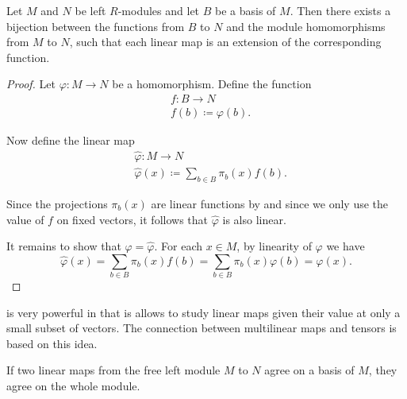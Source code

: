 \begin{theorem}\label{thm:linear_map_iff_function_on_basis}
  Let \( M \) and \( N \) be left \( R \)-modules and let \( B \) be a basis of \( M \). Then there exists a bijection between the functions from \( B \) to \( N \) and the module homomorphisms from \( M \) to \( N \), such that each linear map is an extension of the corresponding function.
\end{theorem}
\begin{proof}
  Let \( \varphi: M \to N \) be a homomorphism. Define the function
  \begin{align*}
    &f: B \to N \\
    &f(b) \coloneqq \varphi(b).
  \end{align*}

  Now define the linear map
  \begin{align*}
    &\hat \varphi: M \to N \\
    &\hat \varphi(x) \coloneqq \sum_{b \in B} \pi_b(x) f(b).
  \end{align*}

  Since the projections \( \pi_b(x) \) are linear functions by  and since we only use the value of \( f \) on fixed vectors, it follows that \( \hat \varphi \) is also linear.

  It remains to show that \( \varphi = \hat \varphi \). For each \( x \in M \), by linearity of \( \varphi \) we have
  \begin{equation*}
    \hat \varphi(x)
    =
    \sum_{b \in B} \pi_b(x) f(b)
    =
    \sum_{b \in B} \pi_b(x) \varphi(b)
    =
    \varphi(x).
  \end{equation*}
\end{proof}

\begin{remark}\label{remark:linear_map_iff_function_on_basis}
   is very powerful in that is allows to study linear maps given their value at only a small subset of vectors. The connection between multilinear maps and tensors is based on this idea.
\end{remark}

\begin{corollary}\label{thm:linear_maps_agree_on_free_module_if_they_agree_on_basis}
  If two linear maps from the free left module \( M \) to \( N \) agree on a basis of \( M \), they agree on the whole module.
\end{corollary}

